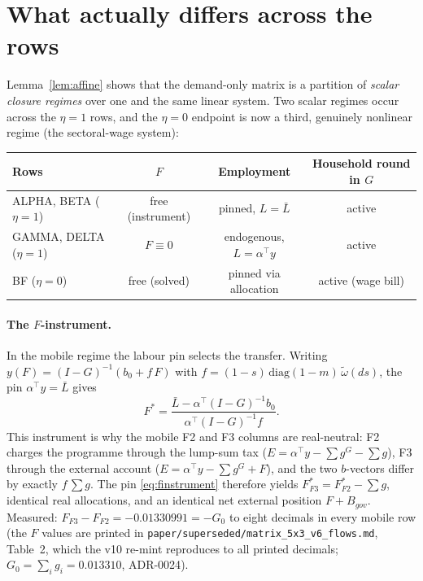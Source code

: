 \documentclass[11pt]{article}
\numberwithin{equation}{section}
\newcommand{\Lbar}{\bar{L}}
\begin{document}
\section{What actually differs across the rows}\label{sec:gauge}

Lemma~\ref{lem:affine} shows that the demand-only matrix is a partition of
\emph{scalar closure regimes} over one and the same linear system.
\textcolor{revisionV3}{Two scalar regimes occur across the $\eta = 1$
rows, and the $\eta = 0$ endpoint is now a third, genuinely nonlinear
regime (the sectoral-wage system):}

\begin{center}
{\small
\begin{tabular}{lccc}
\toprule
Rows & $F$ & Employment & Household round in $G$ \\
\midrule
ALPHA, BETA ($\eta = 1$) & free (instrument) & pinned, $L = \Lbar$ & active \\
GAMMA, DELTA ($\eta = 1$) & $F \equiv 0$ & endogenous, $L = \alpha^{\!\top}y$ & active \\
\textcolor{revisionV1}{BF ($\eta = 0$)} & \textcolor{revisionV1}{free (solved)} & \textcolor{revisionV1}{pinned via allocation} & \textcolor{revisionV1}{active (wage bill)} \\
\bottomrule
\end{tabular}
}
\end{center}

\paragraph{The $F$-instrument.} In the mobile regime the labour pin selects
the transfer. Writing $y(F) = (I-G)^{-1}(b_0 + f\,F)$ with
$f = (1-s)\,\mathrm{diag}(1-m)\,\tilde\omega(ds)$, the pin
$\alpha^{\!\top}y = \Lbar$ gives
\begin{equation}
F^{\ast} = \frac{\Lbar - \alpha^{\!\top}(I-G)^{-1} b_0}
               {\alpha^{\!\top}(I-G)^{-1} f}.
\label{eq:finstrument}
\end{equation}
This instrument is why the mobile F2 and F3 columns are real-neutral: F2
charges the programme through the lump-sum tax ($E = \alpha^{\!\top}y -
\sum g^G - \sum g$), F3 through the external account ($E = \alpha^{\!\top}y
- \sum g^G + F$), and the two $b$-vectors differ by exactly
$f\,\sum g$. The pin \eqref{eq:finstrument} therefore yields
$F^{\ast}_{F3} = F^{\ast}_{F2} - \sum g$, identical real allocations, and
an identical net external position $F + B_{gov}$. Measured: $F_{F3} - F_{F2} = -0.01330991 = -G_0$ to eight
decimals in every mobile row (\textcolor{revisionV3}{the $F$ values are printed
in \texttt{paper/superseded/matrix\_5x3\_v6\_flows.md}, Table~2, which the v10
re-mint reproduces to all printed decimals; $G_0 = \sum_i g_i = 0.013310$,
ADR-0024}).
\end{document}
